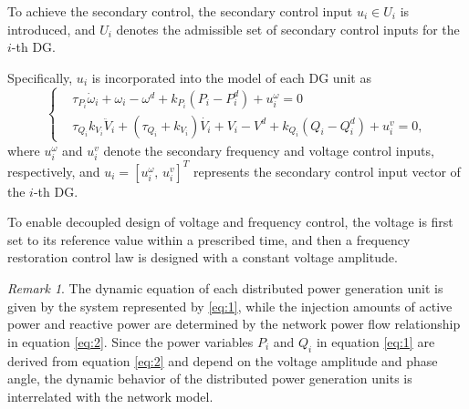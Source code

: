 \documentclass[]{interact}
\theoremstyle{plain}%
\theoremstyle{definition}
\theoremstyle{remark}
\newtheorem{remark}{Remark}
\begin{document}
To achieve the secondary control, the secondary control input \( u_i \in U_i \) is introduced, and $U_i$ denotes the admissible set of secondary control inputs for the $i$-th DG.

Specifically, \( u_i \) is incorporated into the model of each DG unit as
\begin{equation}
\label{eq:3}
\left\{
\begin{aligned}
    &\tau_{P_i} \dot{\omega}_i + \omega_i - \omega^d + k_{P_i} (P_i - P_i^d) + u_i^\omega = 0 \\
    &\tau_{Q_i} k_{V_i} \ddot{V}_i + (\tau_{Q_i}+ k_{V_i}) \dot{V_i} + V_i - V^d + k_{Q_i} (Q_i - Q_i^d) + u_i^v = 0,
\end{aligned}
\right.
\end{equation}
where \( u_i^\omega \) and \( u_i^v \) denote the secondary frequency and voltage control inputs, respectively, and $u_i = [u_i^\omega,\, u_i^v]^T$ represents the secondary control input vector of the $i$-th DG.



To enable decoupled design of voltage and frequency control, the voltage is first set to its reference value within a prescribed time, and then a frequency restoration control law is designed with a constant voltage amplitude.


\begin{remark}
The dynamic equation of each distributed power generation unit is given by the system represented by \eqref{eq:1}, while the injection amounts of active power and reactive power are determined by the network power flow relationship in equation \eqref{eq:2}. Since the power variables \(P_i\) and \(Q_i\) in equation \eqref{eq:1} are derived from equation \eqref{eq:2} and depend on the voltage amplitude and phase angle, the dynamic behavior of the distributed power generation units is interrelated with the network model.
\end{remark}




\end{document}
